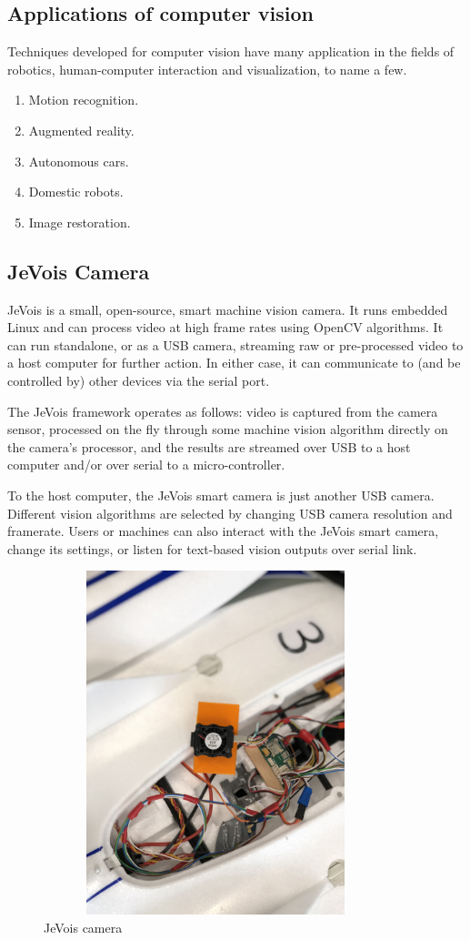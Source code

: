 \subsection{Applications of computer vision}
Techniques developed for computer vision have many application in the fields of robotics, human-computer interaction and visualization, to name a few.
\begin{enumerate}
    \item Motion recognition.
    \item Augmented reality.
    \item Autonomous cars.
    \item Domestic robots.
    \item Image restoration.
\end{enumerate}

\subsection{JeVois Camera}
JeVois is a small, open-source, smart machine vision camera. It runs embedded Linux and can process video at high frame rates using OpenCV algorithms. It can run standalone, or as a USB camera, streaming raw or pre-processed video to a host computer for further action. In either case, it can communicate to (and be controlled by) other devices via the serial port.

The JeVois framework operates as follows: video is captured from the camera sensor, processed on the fly through some machine vision algorithm directly on the camera's processor, and the results are streamed over USB to a host computer and/or over serial to a micro-controller.

To the host computer, the JeVois smart camera is just another USB camera. Different vision algorithms are selected by changing USB camera resolution and framerate. Users or machines can also interact with the JeVois smart camera, change its settings, or listen for text-based vision outputs over serial link.\cite{JeVois}
\begin{figure}[H]
\centering
\includegraphics[width=10cm,height=10cm,keepaspectratio]{imagenes/jevois.jpg}
\caption{JeVois camera}
\label{fig:jevois}
\end{figure}
